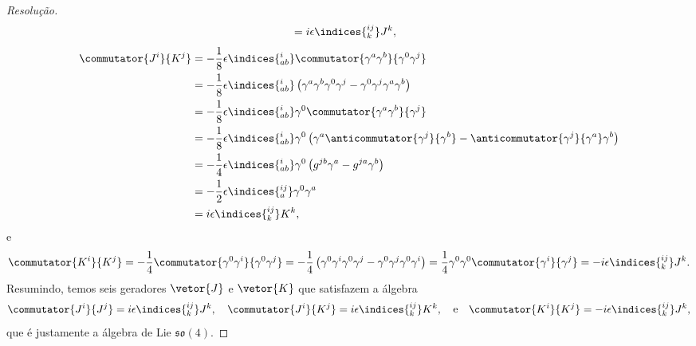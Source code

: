 \begin{proof}[Resolução]
\begin{align*}
                              &= i \epsilon\indices{^{ij}_k}J^k,
    \end{align*}
    \begin{align*}
        \commutator{J^i}{K^j} &= -\frac{1}{8} \epsilon\indices{^i_{ab}} \commutator{\gamma^a \gamma^b}{\gamma^0\gamma^j}\\
                              &= -\frac{1}{8} \epsilon\indices{^i_{ab}} \left(\gamma^a \gamma^b \gamma^0 \gamma^j - \gamma^0 \gamma^j \gamma^a \gamma^b\right)\\
                              &= -\frac{1}{8} \epsilon\indices{^i_{ab}} \gamma^0\commutator{\gamma^a \gamma^b}{\gamma^j}\\
                              &= -\frac{1}{8}\epsilon\indices{^i_{ab}} \gamma^0\left(\gamma^a\anticommutator{\gamma^j}{\gamma^b} - \anticommutator{\gamma^j}{\gamma^a} \gamma^b\right)\\
                              &= -\frac{1}{4}\epsilon\indices{^i_{ab}} \gamma^0\left(g^{jb}\gamma^a- g^{ja} \gamma^b\right)\\
                              &= -\frac12 \epsilon\indices{^{ij}_a} \gamma^0 \gamma^a\\
                              &= i\epsilon\indices{^{ij}_k}K^k,
    \end{align*}
    e
    \begin{equation*}
        \commutator{K^i}{K^j} = -\frac{1}{4}\commutator{\gamma^0 \gamma^i}{\gamma^0\gamma^j}
        = -\frac{1}{4}\left(\gamma^0 \gamma^i \gamma^0 \gamma^j - \gamma^0 \gamma^j \gamma^0 \gamma^i\right)
        = \frac{1}{4}\gamma^0 \gamma^0 \commutator{\gamma^i}{\gamma^j}
        = -i\epsilon\indices{^{ij}_k} J^k.
    \end{equation*}
    Resumindo, temos seis geradores \(\vetor{J}\) e \(\vetor{K}\) que satisfazem a álgebra
    \begin{equation*}
        \commutator{J^i}{J^j} = i \epsilon\indices{^{ij}_k} J^k,\quad
        \commutator{J^i}{K^j} = i \epsilon\indices{^{ij}_k} K^k,\quad\text{e}\quad
        \commutator{K^i}{K^j} = -i \epsilon\indices{^{ij}_k} J^k,
    \end{equation*}
    que é justamente a álgebra de Lie \(\mathfrak{so}(4).\)


\end{proof}
